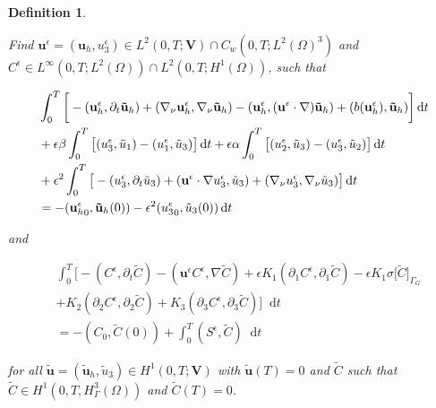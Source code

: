\documentclass[11pt]{article}
\newtheorem{definition}{Definition}
\newcommand*\diff{\mathop{}\!\mathrm{d}}
\begin{document}
 \begin{definition} \label{definitionanisotropicWF}
  
  Find $\mathbf{u}^\epsilon = (\mathbf{u}_h, u^\epsilon_3) \in L^2 (0,T ; \mathbf{V}) \cap C_w (0, T; L^2 (\Omega)^3)$ and $C^\epsilon \in L^\infty (0,T; L^2(\Omega)) \cap L^2 (0,T; H^1(\Omega))$, such that
  
  \begin{equation}
    \begin{split}
      & \int_0^T \bigg [ -(\mathbf{u}^\epsilon_h, \partial_t \mathbf{\tilde{u}}_h) + (\nabla_\nu \mathbf{u}^\epsilon_h, \nabla_\nu \mathbf{\tilde{u}}_h) - (\mathbf{u}^\epsilon_h, (\mathbf{u}^\epsilon \cdot \nabla) \mathbf{\tilde{u}}_h) + (b(\mathbf{u}^\epsilon_h), \mathbf{\tilde{u}}_h) \bigg ] \diff t \\
      & + \epsilon \beta \int_0 ^ T \big [ (u_3 ^\epsilon, \tilde{u}_1) - (u_1^\epsilon, \tilde{u}_3) \big ] \diff t + \epsilon \alpha \int_0 ^ T \big [ (u_2 ^\epsilon, \tilde{u}_3) - (u_3^\epsilon, \tilde{u}_2) \big ] \diff t\\
      & + \epsilon^2 \int _0 ^ T \big [ -(u_3^\epsilon, \partial_t \tilde{u}_3) +(\mathbf{u}^\epsilon \cdot \nabla u_3 ^ \epsilon, \tilde{u}_3) + (\nabla_\nu u_3^\epsilon, \nabla_\nu \tilde{u}_3) \big ] \diff t \\
      & = - ({\mathbf{u}^\epsilon_h}_0, \mathbf{\tilde{u}}_h(0)) - \epsilon^2 ({u^\epsilon_3}_0, \tilde{u}_3 (0)) \diff t \raisetag{20pt} \label{anisotropicWF}
    \end{split}
  \end{equation}
  
    and
  
    \begin{equation}
    \begin{split} \nonumber
      & \int_0^T \bigg [ -(C^\epsilon, \partial_t \tilde{C}) -(\mathbf{u}^\epsilon C^\epsilon, \nabla \tilde{C}) + \epsilon K_1 (\partial_1 C^\epsilon, \partial_1 \tilde{C}) - \epsilon K_1 \sigma \big[\tilde{C} \big] _{\Gamma_G} \\
      & + K_2 (\partial_2 C^\epsilon, \partial_2 \tilde{C}) + K_3 (\partial_3 C^\epsilon, \partial_3 \tilde{C}) \bigg ] \diff t \\
      & =  - (C_0, \tilde{C} (0)) + \int_0^T (S^\epsilon,\tilde{C}) \diff t
    \end{split}
  \end{equation}
  
  for all $\mathbf{\tilde{u}} = (\mathbf{\tilde{u}}_h, \tilde{u}_3) \in H^1 (0,T;\mathbf{V})$ with $\mathbf{\tilde{u}}(T) = 0$ and $\tilde{C}$ such that $\tilde{C} \in H^1 (0,T, H^3_{\Gamma} (\Omega))$ and $\tilde{C} (T) = 0$.
  
  \end{definition}
\end{document}
